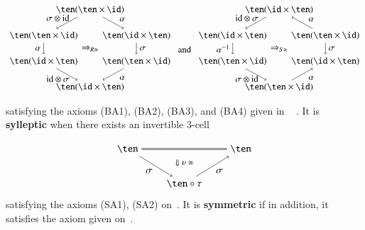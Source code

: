 \begin{defn}
\begin{equation}
  \begin{aligned}
\begin{tikzpicture}[xscale=0.9]
\node (t) at (2,3) {$\ten (\ten \times \id)$};
\node (tl) at (0,2) {$\ten(\ten \times \id)$};
\node (bl) at (0,1) {$\ten (\id \times \ten)$};
\node (b) at (2,0) {$\ten (\id \times \ten)$};
\node (tr) at (4,2) {$\ten(\id \times \ten)$};
\node (br) at (4,1) {$\ten (\ten \times \id)$};
\draw[->] (t) to node [above,xshift=10pt, yshift=-2] {$\alpha$} (tr);
\draw[->] (tr) to node [right] {$\sigma$} (br);
\draw[->] (br) to node [below,xshift=10pt, yshift=2pt] {$\alpha$} (b);
\draw[->] (t) to node [above,xshift=-10pt, yshift=-2pt] {$\sigma \otimes \mbox{id}$} (tl);
\draw[->] (tl) to node [left] {$\alpha$} (bl);
\draw[->] (bl) to node [below,xshift=-10pt,yshift=2pt] {$\mathid \otimes \sigma$} (b);
\node at (2,1.5) {$\Rightarrow_{R \iso}$};
\end{tikzpicture}
  \end{aligned}
\hspace{5pt}\mbox{and} \hspace{5pt}
\begin{aligned}
\begin{tikzpicture}[xscale=0.9]
\node (t) at (2,3) {$\ten(\id \times \ten)$};
\node (tl) at (0,2) {$\ten(\id \times \ten)$};
\node (bl) at (0,1) {$\ten(\ten \times \id)$};
\node (b) at (2,0) {$\ten(\ten \times \id)$};
\node (tr) at (4,2) {$\ten(\ten \times \id)$};
\node (br) at (4,1) {$\ten(\id \times \ten)$};
\draw[->] (tr) to node [above,xshift=10pt, yshift=-2] {$\alpha$} (t);
\draw[->] (tr) to node [right] {$\sigma$} (br);
\draw[->] (b) to node [below,xshift=10pt, yshift=2pt] {$\alpha$} (br);
\draw[->] (t) to node [above,xshift=-10pt, yshift=-2pt] {$\mbox{id} \otimes \sigma$} (tl);
\draw[->] (tl) to node [left] {${\alpha}^{-1}$} (bl);
\draw[->] (bl) to node [below,xshift=-10pt,yshift=2pt] {$\sigma \otimes \mathid$} (b);
\node at (2,1.5) {$\Rightarrow_{S \iso}$};
\end{tikzpicture}
\end{aligned}
\end{equation}
satisfying the axioms (BA1), (BA2), (BA3), and (BA4) given in ~\cite[p136--139]{mccrudden:bal-coalgb} . 
It is {\bf sylleptic} when there exists an invertible 3-cell

 \[
 \begin{tikzpicture}
 \node (tl) at (-2,1) {$\ten$};
 \node (tr) at (2,1) {$\ten$};
 \node (b) at (0,-.25) {$\ten \circ \tau$};
 \draw[double] (tl)  -- (tr);
 \draw[->] (tl) to node[left, yshift=-5pt]{$\sigma$} (b);
 \draw[->] (b) to node[right, yshift=-5pt] {$\sigma$}(tr);
 \node at (0,0.5) {\footnotesize $\Downarrow \upsilon \iso$}; 
 \end{tikzpicture}
 \]
  satisfying the axioms (SA1), (SA2) on~\cite[p144--145]{mccrudden:bal-coalgb}. It is {\bf symmetric} if in addition, it satisfies the axiom given on~\cite[p91]{mccrudden:bal-coalgb}.
\end{defn}


